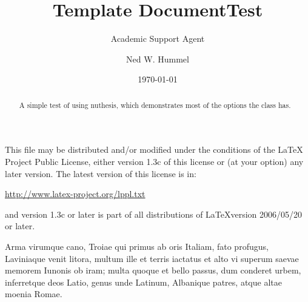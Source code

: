 \documentclass{article}
\title{Template Document}
\author{Academic Support Agent}
\date{\today}
\begin{document}
\maketitle



\title{Test}
\author{Ned W. Hummel}
\major{\LaTeX}
\maketitle
\begin{abstract}
  A simple test of using \textsf{nuthesis}, which demonstrates most
  of the options the class has.
\end{abstract}

\begin{copyrightpage}
This file may be distributed and/or modified under the conditions of
the \LaTeX{} Project Public License, either version 1.3c of this license
or (at your option) any later version.  The latest version of this
license is in:
\begin{center}
   \url{http://www.latex-project.org/lppl.txt}
\end{center}
and version 1.3c or later is part of all distributions of \LaTeX version
2006/05/20 or later.
\end{copyrightpage}

\begin{dedication}
  Arma virumque cano, Troiae qui primus ab oris Italiam, fato
  profugus, Laviniaque venit litora, multum ille et terris iactatus et
  alto vi superum saevae memorem Iunonis ob iram; multa quoque et
  bello passus, dum conderet urbem, inferretque deos Latio, genus unde
  Latinum, Albanique patres, atque altae moenia Romae.
\end{dedication}
\end{document}
